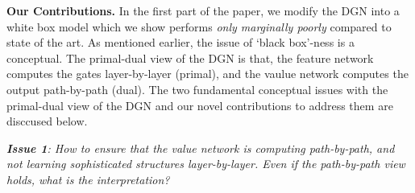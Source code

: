 

  


\textbf{Our Contributions.} In the first part of the paper, we modify the DGN \citep{npk} into a white box model which we show performs \emph{only marginally poorly} compared to state of the art. As mentioned earlier, the issue of `black box'-ness is a conceptual. The primal-dual view of the DGN is that, the feature network computes the gates layer-by-layer (primal), and the vaulue network computes the output path-by-path (dual). The two fundamental conceptual issues with the primal-dual view of the DGN and our novel contributions to address them are disccused below.

\emph{\textbf{Issue 1}: How to ensure that the value network is computing path-by-path, and not learning sophisticated structures layer-by-layer. Even if the path-by-path view holds, what is the interpretation?}


